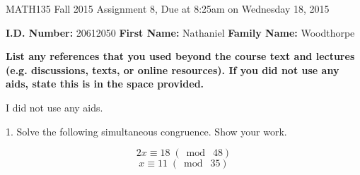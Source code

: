 \documentclass{letter}
\begin{document}
	\begin{center}
		\large MATH135 Fall 2015 Assignment 8, Due at 8:25am on Wednesday 18, 2015\\
	\end{center}
	\vspace{0.25 in}
	\textbf{I.D. Number:} 20612050 \textbf{First Name:} Nathaniel \textbf{Family Name:} Woodthorpe
	
	\textbf{List any references that you used beyond the course text and lectures (e.g. discussions, texts, or online resources). If you did not use any aids, state this is in the space provided.}
	
	I did not use any aids.
	
	
	\clearpage
	
	\large 1. Solve the following simultaneous congruence. Show your work.
	
	\[ 2x \equiv 18 \;(\bmod\; 48)\]
	\[x \equiv 11 \;(\bmod\; 35) \]
	
	
	\hrulefill\\
	
\end{document}
